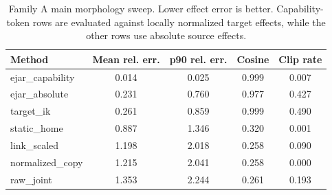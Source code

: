 \begin{table}[t]
\centering
\small
\caption{Family A main morphology sweep. Lower effect error is better. Capability-token rows are evaluated against locally normalized target effects, while the other rows use absolute source effects.}
\label{tab:main-sweep}
\begin{tabular}{lcccc}
\toprule
Method & Mean rel. err. & p90 rel. err. & Cosine & Clip rate \\
\midrule
ejar\_capability & 0.014 & 0.025 & 0.999 & 0.007 \\
ejar\_absolute & 0.231 & 0.760 & 0.977 & 0.427 \\
target\_ik & 0.261 & 0.859 & 0.999 & 0.490 \\
static\_home & 0.887 & 1.346 & 0.320 & 0.001 \\
link\_scaled & 1.198 & 2.018 & 0.258 & 0.090 \\
normalized\_copy & 1.215 & 2.041 & 0.258 & 0.000 \\
raw\_joint & 1.353 & 2.244 & 0.261 & 0.193 \\
\bottomrule
\end{tabular}
\end{table}
